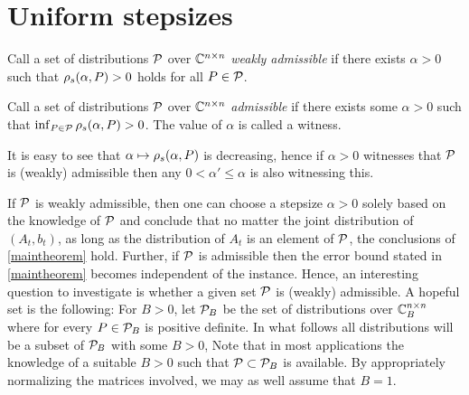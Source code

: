 \documentclass{article}
\begin{document}
\section{Uniform stepsizes}
\begin{definition}
Call a set of distributions $\P$ over $\C^{\ncn}$
\emph{weakly admissible} if there exists $\alpha>0$ such that
$\rhos{P}>0$ holds for all $P\in \P$.
\end{definition}
\begin{definition}
Call a set of distributions $\P$ over $\C^{\ncn}$ \emph{admissible}
if there exists some $\alpha>0$ such that $\inf_{P\in \P} \rhos{P}>0$.
The value of $\alpha$ is called a witness.
\end{definition}
It is easy to see that $\alpha \mapsto \rhos{P}$ is decreasing,
hence if $\alpha>0$ witnesses that $\P$ is (weakly) admissible
then any $0<\alpha'\le \alpha$ is also witnessing this.

If $\P$ is weakly admissible, then one can choose a stepsize $\alpha>0$ solely based on the knowledge of $\P$ and
conclude that no matter the joint distribution of $(A_t,b_t)$, as long as the distribution of $A_t$ is an element of $\P$, the conclusions of \cref{maintheorem} hold. Further, if $\P$ is admissible then the error bound stated in  \cref{maintheorem} becomes independent of the instance.
Hence, an interesting question to investigate is whether a given set $\P$ is (weakly) admissible.
A hopeful set is the following:
For $B>0$, let $\P_B$ be the set of distributions over $\C_B^{\ncn}$ where for every $P\in \P_B$ is positive definite.
In what follows all distributions will be a subset of $\P_B$ with some $B>0$,
Note that in most applications the knowledge of a suitable $B>0$ such that $\P\subset \P_B$ is available.
By appropriately normalizing the matrices involved, we may as well assume that $B=1$.
\end{document}
